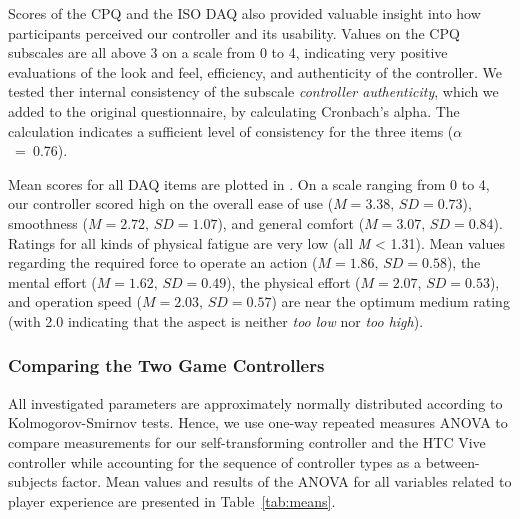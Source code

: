 \documentclass{sigchi}
\begin{document}
Scores of the CPQ and the ISO DAQ also provided valuable insight into how participants perceived our controller and its usability. 
Values on the CPQ subscales are all above 3 on a scale from 0 to 4, indicating very positive evaluations of the look and feel, efficiency, and authenticity of the controller. We tested ther internal consistency of the subscale \textit{controller authenticity}, which we added to the original questionnaire, by calculating Cronbach's alpha. The calculation indicates a sufficient level of consistency for the three items ($\alpha$~=~0.76).

Mean scores for all DAQ items are plotted in . On a scale ranging from 0 to 4, our controller scored high on the overall ease of use ($M = 3.38,\,SD = 0.73$), smoothness ($M = 2.72,\,SD = 1.07$), and general comfort ($M = 3.07,\,SD = 0.84$). Ratings for all kinds of physical fatigue are very low (all \textit{M} < 1.31). 
Mean values regarding the required force to operate an action ($M = 1.86,\,SD = 0.58$), the mental effort ($M = 1.62,\,SD = 0.49$), the physical effort ($M = 2.07,\,SD = 0.53$), and operation speed ($M = 2.03,\,SD = 0.57$) are near the optimum medium rating (with 2.0 indicating that the aspect is neither \textit{too low} nor \textit{too high}).







\subsubsection{Comparing the Two Game Controllers}
All investigated parameters are approximately normally distributed according to Kolmogorov-Smirnov tests. Hence, we use one-way repeated measures ANOVA to compare measurements for our self-transforming controller and the HTC Vive controller while accounting for the sequence of controller types as a between-subjects factor. 
Mean values and results of the ANOVA for all variables related to player experience are presented in Table~\ref{tab:means}.
\end{document}
